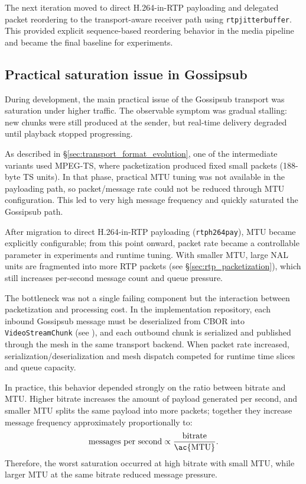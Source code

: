The next iteration moved to direct H.264-in-\ac{RTP} payloading and delegated packet reordering to the transport-aware receiver path using \texttt{rtpjitterbuffer}. This provided explicit sequence-based reordering behavior in the media pipeline and became the final baseline for experiments.

\subsection{Practical saturation issue in Gossipsub}
\label{sec:gossipsub_saturation}
During development, the main practical issue of the Gossipsub transport was saturation under higher traffic.
The observable symptom was gradual stalling: new chunks were still produced at the sender, but real-time delivery degraded until playback stopped progressing.

As described in \S\ref{sec:transport_format_evolution}, one of the intermediate variants used MPEG-TS, where packetization produced fixed small packets (188-byte TS units). In that phase, practical \ac{MTU} tuning was not available in the payloading path, so packet/message rate could not be reduced through \ac{MTU} configuration. This led to very high message frequency and quickly saturated the Gossipsub path.

After migration to direct H.264-in-\ac{RTP} payloading (\texttt{rtph264pay}), \ac{MTU} became explicitly configurable; from this point onward, packet rate became a controllable parameter in experiments and runtime tuning. With smaller \ac{MTU}, large NAL units are fragmented into more \ac{RTP} packets (see \S\ref{sec:rtp_packetization}), which still increases per-second message count and queue pressure.

The bottleneck was not a single failing component but the interaction between packetization and processing cost.
In the implementation repository, each inbound Gossipsub message must be deserialized from CBOR into \texttt{VideoStreamChunk} (see ), and each outbound chunk is serialized and published through the mesh in the same transport backend.
When packet rate increased, serialization/deserialization and mesh dispatch competed for runtime time slices and queue capacity.

In practice, this behavior depended strongly on the ratio between bitrate and \ac{MTU}.
Higher bitrate increases the amount of payload generated per second, and smaller \ac{MTU} splits the same payload into more packets; together they increase message frequency approximately proportionally to:
\[
\text{messages per second} \propto \frac{\text{bitrate}}{\text{\ac{MTU}}}.
\]
Therefore, the worst saturation occurred at high bitrate with small \ac{MTU}, while larger \ac{MTU} at the same bitrate reduced message pressure.

